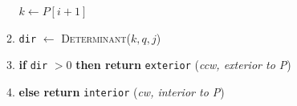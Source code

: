 \documentclass [12pt]{article}
\begin{document}
\begin{enumerate}[label=(\alph*)]
\begin{enumerate}[label=\arabic*.]
                 $k\leftarrow P[i+1]$

                \item \texttt{dir} $\leftarrow$ \textsc{Determinant}($k, q, j$)
                \item \textbf{if} \texttt{dir} $> 0$ \textbf{then return} \texttt{exterior} \hspace{1cm} (\emph{ccw, exterior to P})
                \item \textbf{else return} \texttt{interior} \hspace{1cm} (\emph{cw, interior to P})
                

                

            \end{enumerate}
        \cbend


\end{enumerate}
\end{document}
